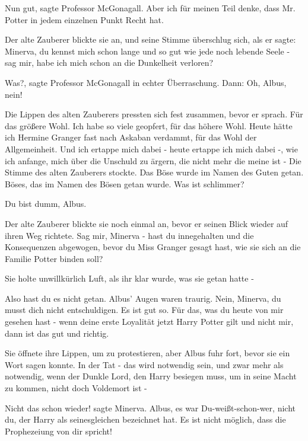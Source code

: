 \glqq Nun gut\grqq{}, sagte Professor McGonagall. \glqq Aber ich für meinen Teil
denke, dass Mr. Potter in jedem einzelnen Punkt Recht hat.\grqq{}

Der alte Zauberer blickte sie an, und seine Stimme überschlug sich, als er
sagte: \glqq Minerva, du kennst mich schon lange und so gut wie jede noch
lebende Seele - sag mir, habe ich mich schon an die Dunkelheit verloren?\grqq{}

\glqq Was?\grqq{}, sagte Professor McGonagall in echter Überraschung. Dann:
\glqq Oh, Albus, nein!\grqq{}

Die Lippen des alten Zauberers pressten sich fest zusammen, bevor er sprach.
\glqq Für das größere Wohl. Ich habe so viele geopfert, für das höhere Wohl.
Heute hätte ich Hermine Granger fast nach Askaban verdammt, für das Wohl der
Allgemeinheit. Und ich ertappe mich dabei - heute ertappe ich mich dabei -, wie
ich anfange, mich über die Unschuld zu ärgern, die nicht mehr die meine ist
-\grqq{} Die Stimme des alten Zauberers stockte. \glqq Das Böse wurde im Namen
des Guten getan. Böses, das im Namen des Bösen getan wurde. Was ist
schlimmer?\grqq{}

\glqq Du bist dumm, Albus.\grqq{}

Der alte Zauberer blickte sie noch einmal an, bevor er seinen Blick wieder auf
ihren Weg richtete. \glqq Sag mir, Minerva - hast du innegehalten und die
Konsequenzen abgewogen, bevor du Miss Granger gesagt hast, wie sie sich an die
Familie Potter binden soll?\grqq{}

Sie holte unwillkürlich Luft, als ihr klar wurde, was sie getan hatte -

\glqq Also hast du es nicht getan.\grqq{} Albus' Augen waren traurig. \glqq
Nein, Minerva, du musst dich nicht entschuldigen. Es ist gut so. Für das, was du
heute von mir gesehen hast - wenn deine erste Loyalität jetzt Harry Potter gilt
und nicht mir, dann ist das gut und richtig.\grqq{}

Sie öffnete ihre Lippen, um zu protestieren, aber Albus fuhr fort, bevor sie ein
Wort sagen konnte. \glqq In der Tat - das wird notwendig sein, und zwar mehr als
notwendig, wenn der Dunkle Lord, den Harry besiegen muss, um in seine Macht zu
kommen, nicht doch Voldemort ist -\grqq{}

\glqq Nicht das schon wieder!\grqq{} sagte Minerva. \glqq Albus, es war
Du-weißt-schon-wer, nicht du, der Harry als seinesgleichen bezeichnet hat. Es
ist nicht möglich, dass die Prophezeiung von dir spricht!\grqq{}

